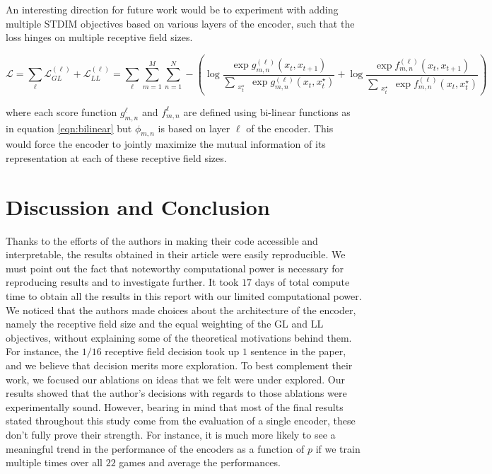 An interesting direction for future work would be to experiment with adding multiple STDIM objectives based on various layers of the encoder, such that the loss hinges on multiple receptive field sizes.

\begin{equation}
\mathcal{L}=\sum_{\ell}\mathcal{L}^{(\ell)}_{GL}+\mathcal{L}^{(\ell)}_{LL}=\sum_{\ell}\sum_{m=1}^M\sum_{n=1}^N-\left(\log{\frac{\exp{g^{(\ell)}_{m,n}(x_t,x_{t+1})}}{\sum\limits_{\substack{x_t^\star}} \exp{g^{(\ell)}_{m,n}(x_t,x_t^\star)}}}+\log{\frac{\exp{f^{(\ell)}_{m,n}(x_t,x_{t+1})}}{\sum\limits_{\substack{x_t^\star}} \exp{f^{(\ell)}_{m,n}(x_t,x_t^\star)}}}\right)
\label{eqn:loss-functions-over-layers}
\end{equation}

where each score function $g^{\ell}_{m,n}$ and $f^{\ell}_{m,n}$ are defined using bi-linear functions as in equation \ref{eqn:bilinear} but $\phi_{m,n}$ is based on layer $\ell$ of the encoder. This would force the encoder to jointly maximize the mutual information of its representation at each of these receptive field sizes.

\section{Discussion and Conclusion}
Thanks to the efforts of the authors in making their code accessible and interpretable, the results obtained in their article were easily reproducible. We must point out the fact that noteworthy computational power is necessary for reproducing results and to investigate further. It took $17$ days of total compute time to obtain all the results in this report with our limited computational power.\\

We noticed that the authors made choices about the architecture of the encoder, namely the receptive field size and the equal weighting of the GL and LL objectives, without explaining some of the theoretical motivations behind them. For instance, the $1/16$ receptive field decision took up $1$ sentence in the paper, and we believe that decision merits more exploration. To best complement their work, we focused our ablations on ideas that we felt were under explored. Our results showed that the author's decisions with regards to those ablations were experimentally sound. However, bearing in mind that most of the final results stated throughout this study come from the evaluation of a single encoder, these don't fully prove their strength. For instance, it is much more likely to see a meaningful trend in the performance of the encoders as a function of $p$ if we train multiple times over all $22$ games and average the performances. \\

